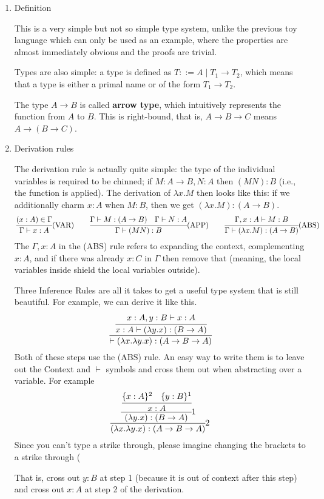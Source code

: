 \documentclass[a4paper]{exam}
\begin{document}
\begin{enumerate}
\item Definition

This is a very simple but not so simple type system, unlike the previous toy language which can only be used as an example, where the properties are almost immediately obvious and the proofs are trivial.

Types are also simple: a type is defined as $T::=A\mid T_1\to T_2$, which means that a type is either a primal name or of the form $T_1\to T_2$.

The type $A\to B$ is called \textbf{arrow type}, which intuitively represents the function from $A$ to $B$. This is right-bound, that is, $A\to B\to C$ means $A\to(B\to C)$.

\item Derivation rules

The derivation rule is actually quite simple: the type of the individual variables is required to be chinned; if $M:A\to B,N:A$ then $(MN):B$ (i.e., the function is applied). The derivation of $\lambda x.M$ then looks like this: if we additionally charm $x:A$ when $M:B$, then we get $(\lambda x. M):(A\to B)$.
$$
  \cfrac{(x:A)\in\Gamma}{\Gamma\vdash x:A}{\rm\tiny(VAR)}
  \qquad\cfrac{\Gamma\vdash M:(A\to B)\quad\Gamma\vdash N:A}{\Gamma\vdash (MN):B}{\rm\tiny(APP)}
  \qquad\cfrac{\Gamma,x:A\vdash M:B}{\Gamma\vdash (\lambda x.M):(A\to B)}{\rm\tiny(ABS)}
$$
The $\Gamma, x:A$ in the (ABS) rule refers to expanding the context, complementing $x:A$, and if there was already $x:C$ in $\Gamma$ then remove that (meaning, the local variables inside shield the local variables outside).

Three Inference Rules are all it takes to get a useful type system that is still beautiful. For example, we can derive it like this.
$$
  \cfrac{\cfrac{x:A,y:B\vdash x:A}{x:A\vdash(\lambda y.x):(B\to A)}}{\vdash (\lambda x.\lambda y.x):(A\to B\to A)}
$$
Both of these steps use the (ABS) rule. An easy way to write them is to leave out the Context and $\vdash$ symbols and cross them out when abstracting over a variable. For example
$$
  \cfrac{\cfrac{\cfrac{\{x:A\}^2\quad\{y:B\}^1}{x:A}}{(\lambda y.x):(B\to A)}\small1}{(\lambda x.\lambda y.x):(A\to B\to A)}\small2
$$
Since you can't type a strike through, please imagine changing the brackets to a strike through (

That is, cross out $y:B$ at step 1 (because it is out of context after this step) and cross out $x:A$ at step 2 of the derivation.


\end{enumerate}
\end{document}
